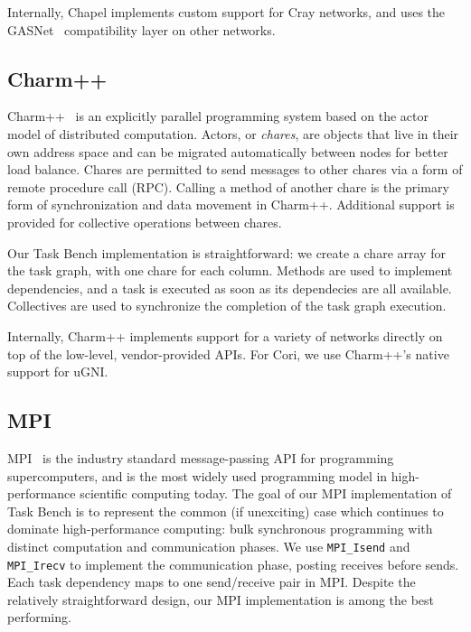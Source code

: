 
Internally, Chapel implements custom support for Cray networks, and
uses the GASNet~\cite{GASNET07} compatibility layer on other networks.

\subsection{Charm++}

Charm++~\cite{Charmpp93} is an explicitly parallel programming system
based on the actor model of distributed computation. Actors, or
\emph{chares}, are objects that live in their own address space and
can be migrated automatically between nodes for better load
balance. Chares are permitted to send messages to other chares via a
form of remote procedure call (RPC). Calling a method of another chare
is the primary form of synchronization and data movement in
Charm++. Additional support is provided for collective operations
between chares.

Our Task Bench implementation is straightforward: we create a chare
array for the task graph, with one chare for each column. Methods are
used to implement dependencies, and a task is executed as soon as its
dependecies are all available. Collectives are used to synchronize the
completion of the task graph execution.


Internally, Charm++ implements support for a variety of networks
directly on top of the low-level, vendor-provided APIs. For Cori, we
use Charm++'s native support for uGNI.

\subsection{MPI}

MPI~\cite{MPI} is the industry standard message-passing API for
programming supercomputers, and is the most widely used programming
model in high-performance scientific computing today. The goal of our
MPI implementation of Task Bench is to represent the common (if
unexciting) case which continues to dominate high-performance
computing: bulk synchronous programming with distinct computation and
communication phases. We use \lstinline[language=C++]{MPI_Isend} and
\lstinline[language=C++]{MPI_Irecv} to implement the communication
phase, posting receives before sends. Each task dependency maps to one
send/receive pair in MPI. Despite the relatively straightforward
design, our MPI implementation is among the best performing.

